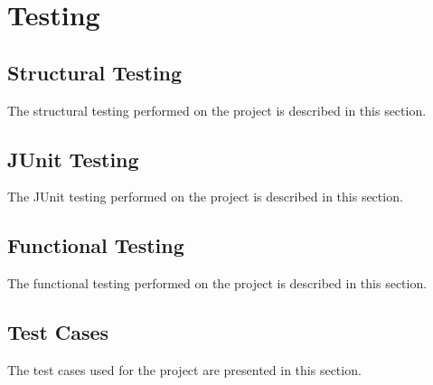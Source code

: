 \chapter{Testing}

\section{Structural Testing}

The structural testing performed on the project is described in this section.

\section{JUnit Testing}

The JUnit testing performed on the project is described in this section.

\section{Functional Testing}

The functional testing performed on the project is described in this section.

\section{Test Cases}

The test cases used for the project are presented in this section.
